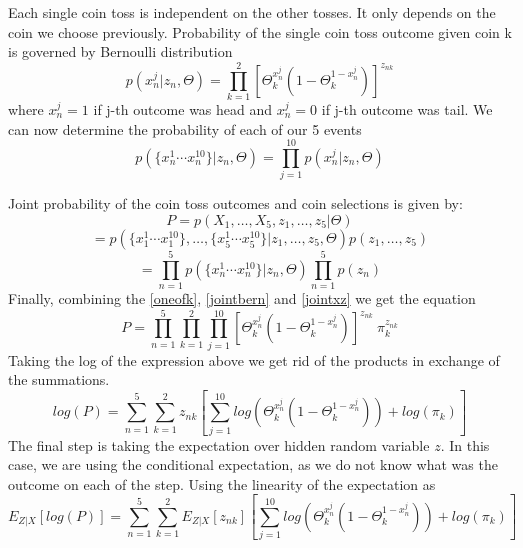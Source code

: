 \documentclass[11pt]{article}
\begin{document}
Each single coin toss is independent on the other tosses. It only depends on the coin we choose previously. Probability of the single coin toss outcome given coin k is governed by Bernoulli distribution
\begin{equation}
p(x_n^j|{z_n},\Theta)=\prod_{k=1}^{2}[\Theta_k^{x_n^j}(1-\Theta_k^{1-x_n^j})]^{z_{nk}}
\end{equation}
where $x_n^j=1$ if j-th outcome was head and $x_n^j=0$ if j-th outcome was tail. We can now determine the probability of each of our 5 events
\begin{equation}\label{jointbern}
p(\{x^1_n\cdots x^{10}_n\}|z_n,\Theta)=\prod_{j=1}^{10}p(x_n^j|{z_n},\Theta)
\end{equation}

Joint probability of the coin toss outcomes and coin selections is given by:
\begin{equation}
P = p(X_1,\dots, X_5,{z_1,\dots,z_5}|\Theta) 
\end{equation}
\begin{equation}
= p(\{x^1_1\cdots x^{10}_1\},\dots,\{x^1_5\cdots x^{10}_5\}| z_1,\dots,z_5,\Theta)p(z_1,\dots,z_5)
\end{equation}
\begin{equation}\label{jointxz}
=\prod_{n=1}^{5}p(\{x^1_n\cdots x^{10}_n\}|z_n,\Theta) \prod_{n=1}^{5}p({z_n})
\end{equation}
Finally, combining the \eqref{oneofk}, \eqref{jointbern} and \eqref{jointxz} we get the equation
\begin{equation}
P = 
\prod_{n=1}^{5}\prod_{k=1}^{2}\prod_{j=1}^{10}[\Theta_k^{x_n^j}(1-\Theta_k^{1-x_n^j})]^{z_{nk}}\:\pi_{k}^{z_{nk}}
\end{equation}
Taking the log of the expression above we get rid of the products in exchange of the summations.
\begin{equation}
log(P) = 
\sum_{n=1}^{5}\sum_{k=1}^{2}z_{nk}[\sum_{j=1}^{10}log(\Theta_k^{x_n^j}(1-\Theta_k^{1-x_n^j}))+log(\pi_{k})]
\end{equation}
The final step is taking the expectation over hidden random variable $z$. In this case, we are using the conditional expectation, as we do not
know what was the outcome on each of the step. Using the linearity of the expectation as
\begin{equation}
E_{Z|X}[log(P)] = 
\sum_{n=1}^{5}\sum_{k=1}^{2}E_{Z|X}[z_{nk}][\sum_{j=1}^{10}log(\Theta_k^{x_n^j}(1-\Theta_k^{1-x_n^j}))+log(\pi_{k})]
\end{equation}
\end{document}
